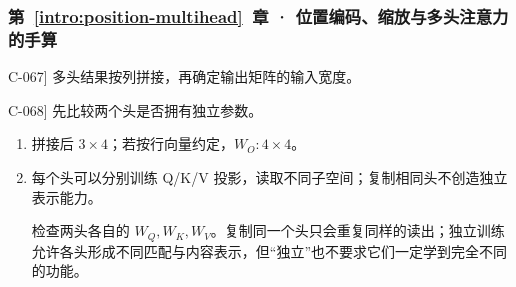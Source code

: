 \subsubsection*{第~\ref*{intro:position-multihead}~章 · 位置编码、缩放与多头注意力的手算}
\begin{answerhints}
\item[\hyperref[exercise:head-concatenation]{C-067}] \leavevmode{}\label{hint:head-concatenation}多头结果按列拼接，再确定输出矩阵的输入宽度。
\item[\hyperref[exercise:head-projection-diversity]{C-068}] \leavevmode{}\label{hint:head-projection-diversity}先比较两个头是否拥有独立参数。
\end{answerhints}
\begin{enumerate}[label={},leftmargin=4.8em,itemsep=4pt]
\item[\textbf{\hyperref[exercise:head-concatenation]{C-067.}}] \leavevmode{}\label{solution:C-067}\label{solution:head-concatenation}拼接后 $3\times4$；若按行向量约定，$W_O:4\times4$。
\item[\textbf{\hyperref[exercise:head-projection-diversity]{C-068.}}] \leavevmode{}\label{solution:C-068}\label{solution:head-projection-diversity}每个头可以分别训练 Q/K/V 投影，读取不同子空间；复制相同头不创造独立表示能力。\par 检查两头各自的 $W_Q,W_K,W_V$。复制同一个头只会重复同样的读出；独立训练允许各头形成不同匹配与内容表示，但“独立”也不要求它们一定学到完全不同的功能。
\end{enumerate}
